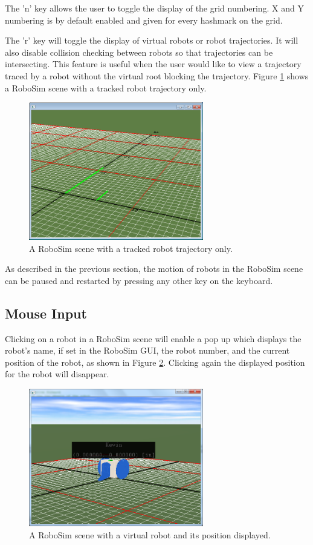 \documentclass{article}
\begin{document}
The 'n' key allows the user to toggle the display of the grid numbering.  X and
Y numbering is by default enabled and given for every hashmark on the grid.

The 'r' key will toggle the display of virtual robots or robot trajectories.  It
will also disable collision checking between robots so that trajectories can be
intersecting.  This feature is useful when the user would like to view a
trajectory traced by a robot without the virtual root blocking the trajectory.
Figure \ref{fig:robosim_norobot} shows a RoboSim scene with a tracked robot
trajectory only.
\begin{figure}[H]
	\begin{center}
		\includegraphics[width=3in]{pictures/robosim_norobot}
	\end{center}
	\caption{A RoboSim scene with a tracked robot trajectory only.}
	\label{fig:robosim_norobot}
\end{figure}

As described in the previous section, the motion of robots in the RoboSim scene
can be paused and restarted by pressing any other key on the keyboard.

\subsection{Mouse Input}
Clicking on a robot in a RoboSim scene will enable a pop up which displays the
robot's name, if set in the RoboSim GUI, the robot number, and the current
position of the robot, as shown in Figure \ref{fig:robosim_pos}.  Clicking again
the displayed position for the robot will disappear.
\begin{figure}[H]
	\begin{center}
		\includegraphics[width=3in]{pictures/robosim_pos}
	\end{center}
	\caption{A RoboSim scene with a virtual robot and its position displayed.}
	\label{fig:robosim_pos}
\end{figure}
\end{document}
